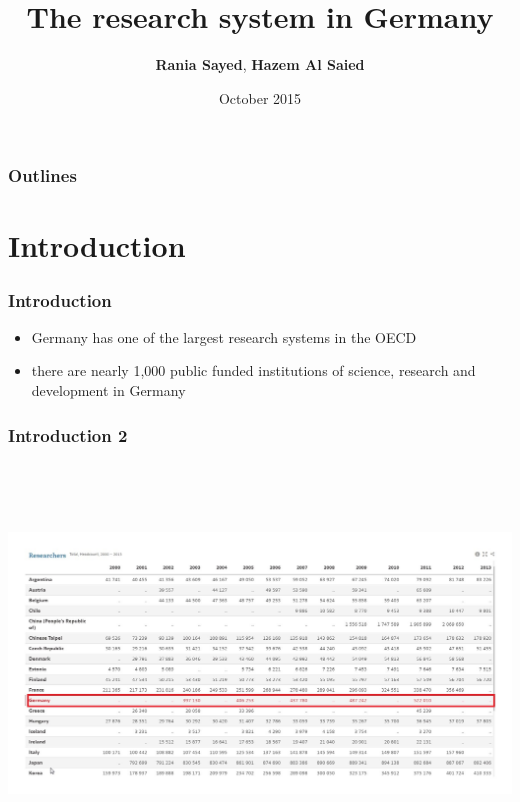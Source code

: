 \documentclass[9pt, compress]{beamer}
\author{\textbf{Rania Sayed}, \textbf{Hazem Al Saied} }
\title{The research system in Germany}
\institute{\textbf{Uinversité de Lorraine}}
\date{October 2015}
\begin{document}
	\maketitle
	\begin{frame}
		\frametitle{Outlines}
		\tableofcontents{}
	\end{frame}
\section{Introduction}
	\begin{frame}
		\frametitle{Introduction}
		\begin{itemize}
		    \item Germany has one of the largest research systems in the OECD
			\item there are nearly 1,000 public   funded institutions of science, research and development in Germany
			 
		\end{itemize}
	\end{frame}

	\begin{frame} %
		\frametitle{Introduction 2}
		\includegraphics[width=\textwidth,height=300pt]{img/no_researchers.jpg}
		
	\end{frame}
\end{document}
